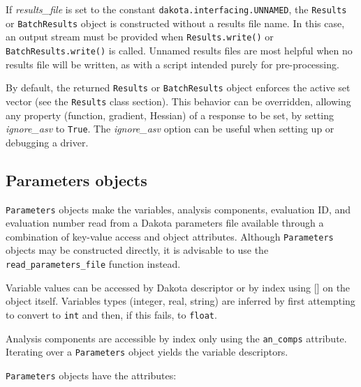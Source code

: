 If \emph{results\_file} is set to the constant {\tt dakota.interfacing.UNNAMED}, the {\tt Results} or 
{\tt BatchResults} object is constructed without a results file name.  In this case, an output stream must be 
provided when {\tt Results.write()} or {\tt BatchResults.write()} is called. Unnamed results files are most 
helpful when no results file will be written, as with a script intended purely for pre-processing.

By default, the returned {\tt Results} or {\tt BatchResults} object enforces the active set vector (see the 
{\tt Results} class section). This behavior can be overridden, allowing any property (function, gradient, Hessian) of 
a response to be set, by setting \emph{ignore\_asv} to {\tt True}. The \emph{ignore\_asv} option can be useful
when setting up or debugging a driver.


\subsection{Parameters objects}

{\tt Parameters} objects make the variables, analysis components, evaluation ID, and evaluation number read from a Dakota parameters file available through a combination of key-value access and object attributes. Although {\tt Parameters} objects may be constructed directly, it is advisable to use the {\tt read\_parameters\_file} function instead.

Variable values can be accessed by Dakota descriptor or by index using {[}{]} on the object itself. Variables types (integer, real, string) are inferred by first attempting to convert to {\tt int} and then, if this fails, to {\tt float}.

Analysis components are accessible by index only using the {\tt an\_comps} attribute. Iterating over a {\tt Parameters} 
object yields the variable descriptors.

{\tt Parameters} objects have the attributes:


